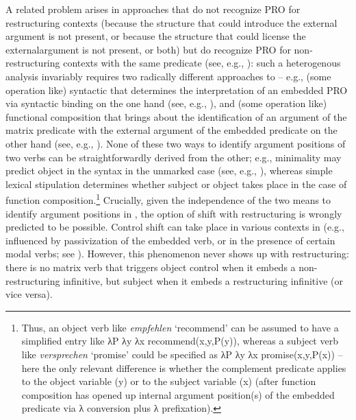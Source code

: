 \documentclass[output=paper]{langsci/langscibook}
\begin{document}
A related problem arises in approaches that do not recognize PRO for
restructuring contexts (because the structure that could introduce the external
argument is not present, or because the structure that could license the
external\linebreak argument is not present, or both) but do recognize PRO for
non-restructuring contexts with the same predicate (see, e.g.,
\citealt{Haider:10}): such a heterogenous analysis invariably requires two
radically different approaches to  -- e.g., (some operation like)
syntactic  that determines the interpretation of an embedded PRO via
syntactic binding on the one hand (see, e.g., \citealt{Landau:00}), and (some
operation like) functional composition that brings about the identification of
an argument of the matrix predicate with the external argument of the embedded
predicate on the other hand (see, e.g., \citealt{Stiebels:07:tow}). None of these
two ways to identify argument positions of two verbs can be straightforwardly
derived from the other; e.g., minimality may predict object  in the
syntax in the unmarked case (see, e.g., \citealt{Hornstein2001}), whereas simple
lexical stipulation determines whether subject or object  takes place in
the case of function composition.\footnote{Thus, an object  verb  like
    {\itshape empfehlen} \enquote*{recommend} can  be assumed to have a simplified
    entry like λP λy λx recommend(x,y,P(y)), whereas a subject 
    verb like {\itshape versprechen} \enquote*{promise} could be specified as λP λy
    λx promise(x,y,P(x)) -- here the only relevant difference is whether
    the complement predicate applies to the object variable (y) or to the
    subject variable (x) (after function composition has opened up internal
argument position(s) of the embedded predicate via λ conversion plus λ
prefixation).} Crucially, given the independence of the two means to identify
argument positions in , the option of  shift with restructuring
is wrongly predicted to be possible. Control shift can take place in various
contexts in   (e.g., influenced by passivization of the embedded verb, or
in the presence of certain modal verbs; see
\citealt{Ruzicka:83,Wurmbrand:02,Stiebels:07:tow}). However, this phenomenon never
shows up with restructuring: there is no matrix verb that triggers object
control when it embeds a non-restructuring infinitive, but subject  when
it embeds a restructuring infinitive (or vice versa).
\end{document}
